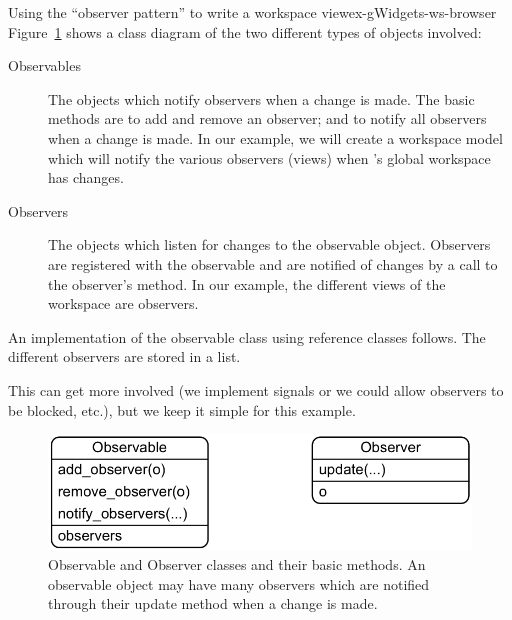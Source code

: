 \begin{example}{Using the ``observer pattern'' to write a workspace view}{ex-gWidgets-ws-browser}
Figure~\ref{fig:observer-observable} shows a class diagram of the two
different types of objects involved:
\begin{description}
\item[Observables] The objects which notify observers when a change is
  made. The basic methods are to add and remove an observer; and to
  notify all observers when a change is made. In our example, we will
  create a workspace model which will notify the various observers
  (views) when \R's global workspace has changes.
\item[Observers] The objects which listen for changes to the
  observable object. Observers are registered with the observable and
  are notified of changes by a call to the observer's 
  method. In our example, the different views of the workspace are
  observers.
\end{description}

An implementation of the observable class using reference classes
follows. The different observers are stored in a list.

\begin{Schunk}
\end{Schunk}
%
This can get more involved (we implement signals or we could allow
observers to be blocked, etc.), but we keep
it simple for this example. 


\begin{figure}
  \centering
  \includegraphics[width=.6\textwidth]{fig-gWidgets-observable-observer-uml.png}
 \caption{Observable and Observer classes and their basic methods. An observable object may have many observers which are notified through their update method when a change is made.}
  \label{fig:observer-observable}
\end{figure}


\end{example}
